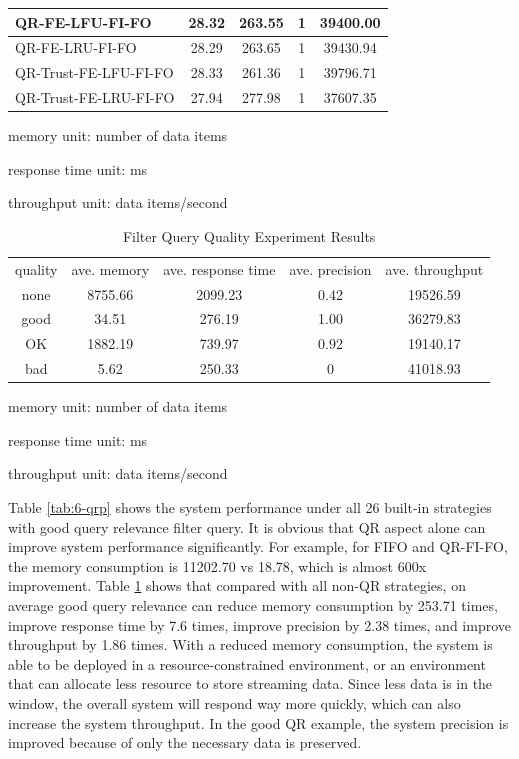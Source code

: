 \begin{table}[!htbp]
\begin{tabular}{|l||c|c|c|c|}
QR-FE-LFU-FI-FO      & 28.32 & 263.55 & 1 & 39400.00\\ \hline 
QR-FE-LRU-FI-FO      & 28.29 & 263.65 & 1 & 39430.94\\ \hline 
QR-Trust-FE-LFU-FI-FO & 28.33 & 261.36 & 1 & 39796.71\\ \hline 
QR-Trust-FE-LRU-FI-FO & 27.94 & 277.98 & 1 & 37607.35\\ \hline 
    \end{tabular}
    \begin{tablenotes}
 		\item memory unit: number of data items
 		\item response time unit: ms
 		\item throughput unit: data items/second
    \end{tablenotes}
\end{table}

\begin{table}[!htbp]
	\centering
    \caption{Filter Query Quality Experiment Results}
    \label{tab:6-fqqi}
    \begin{tabular}{|c||c|c|c|c|} \hline
    quality & ave. memory & ave. response time & ave. precision & ave. throughput \\ \hhline{|=#=|=|=|=|}
    none & 8755.66 & 2099.23 & 0.42 & 19526.59 \\ \hline
    good & 34.51 & 276.19 & 1.00 & 36279.83\\ \hline
    OK & 1882.19 & 739.97 & 0.92 & 19140.17\\ \hline
    bad & 5.62 & 250.33 & 0 & 41018.93\\ \hline
    \end{tabular}
    \begin{tablenotes}
 		\item memory unit: number of data items
 		\item response time unit: ms
 		\item throughput unit: data items/second
    \end{tablenotes}
\end{table}

Table \ref{tab:6-qrp} shows the system performance under all 26 built-in strategies with good query relevance filter query.
It is obvious that QR aspect alone can improve system performance significantly. 
For example, for FIFO and QR-FI-FO, the memory consumption is 11202.70 vs 18.78, which is almost 600x improvement. 
Table \ref{tab:6-fqqi} shows that compared with all non-QR strategies, on average good query relevance can reduce memory consumption by 253.71 times, improve response time by 7.6 times, improve precision by 2.38 times, and improve throughput by 1.86 times. 
With a reduced memory consumption, the system is able to be deployed in a resource-constrained environment, or an environment that can allocate less resource to store streaming data. 
Since less data is in the window, the overall system will respond way more quickly, which can also increase the system throughput. 
In the good QR example, the system precision is improved because of only the necessary data is preserved. 

